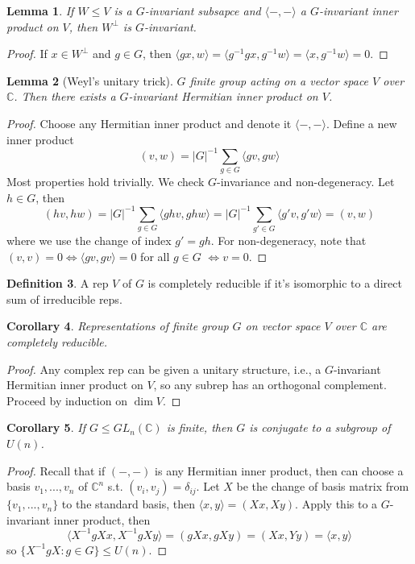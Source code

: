 \documentclass{article}
\theoremstyle{definition}
\newtheorem{defn}{Definition}[section]
\theoremstyle{remark}
\theoremstyle{plain}
\newtheorem{lem}[defn]{Lemma}
\newtheorem{crly}[defn]{Corollary}
\newcommand{\CC}{\mathbb{C}}
\begin{document}
\begin{lem}
If $W\le V$ is a $G$-invariant subsapce and $\langle-,-\rangle$ a $G$-invariant inner product on $V$, then $W^\perp$ is $G$-invariant.
\end{lem}
\begin{proof}
    If $x\in W^\perp$ and $g\in G$, then $\langle gx,w\rangle=\langle g^{-1}gx,g^{-1}w\rangle=\langle x,g^{-1}w\rangle=0$.
\end{proof}
\begin{lem}[Weyl's unitary trick]
    $G$ finite group acting on a vector space $V$ over $\CC$. Then there exists a $G$-invariant Hermitian inner product on $V$.
\end{lem}
\begin{proof}
    Choose any Hermitian inner product and denote it $\langle-,-\rangle$. Define a new inner product 
    \[(v,w)=|G|^{-1}\sum_{g\in G}\langle gv,gw\rangle\]
    Most properties hold trivially. We check $G$-invariance and non-degeneracy. Let $h\in G$, then
    \[(hv,hw)=|G|^{-1}\sum_{g\in G}\langle ghv,ghw\rangle=|G|^{-1}\sum_{g'\in G}\langle g'v,g'w\rangle=(v,w)\]
    where we use the change of index $g'=gh$. For non-degeneracy, note that $(v,v)=0\Leftrightarrow\langle gv,gv\rangle=0$ for all $g\in G$ $\Leftrightarrow v=0$.
\end{proof}
\begin{defn}
    A rep $V$ of $G$ is completely reducible if it's isomorphic to a direct sum of irreducible reps.
\end{defn}
\begin{crly}
    Representations of finite group $G$ on vector space $V$ over $\CC$ are completely reducible.
\end{crly}
\begin{proof}
    Any complex rep can be given a unitary structure, i.e., a $G$-invariant Hermitian inner product on $V$, so any subrep has an orthogonal complement. Proceed by induction on $\dim V$.
\end{proof}
\begin{crly}
    If $G\le GL_n(\CC)$ is finite, then $G$ is conjugate to a subgroup of $U(n)$.
\end{crly}
\begin{proof}
    Recall that if $(-,-)$ is any Hermitian inner product, then can choose a basis $v_1,...,v_n$ of $\CC^n$ s.t. $(v_i,v_j)=\delta_{ij}$. Let $X$ be the change of basis matrix from $\{v_1,...,v_n\}$ to the standard basis, then $\langle x,y\rangle=(Xx,Xy)$. Apply this to a $G$-invariant inner product, then 
    \[\langle X^{-1}gXx,X^{-1}gXy\rangle = (gXx,gXy)=(Xx,Yy)=\langle x,y\rangle\]
    so $\{X^{-1}gX:g\in G\}\le U(n)$.
\end{proof}
\end{document}
